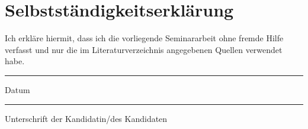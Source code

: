 \chapter{Selbstständigkeitserklärung}
Ich erkläre hiermit, dass ich die vorliegende Seminararbeit ohne fremde Hilfe verfasst und nur die im Literaturverzeichnis angegebenen Quellen verwendet habe.

\vspace{3cm}

\begin{minipage}[t]{3cm}
	\rule{3cm}{0.5pt}
	Datum
\end{minipage}
\hfill
\begin{minipage}[t]{9cm}
	\rule{9cm}{0.5pt}
	Unterschrift der Kandidatin/des Kandidaten
\end{minipage}
